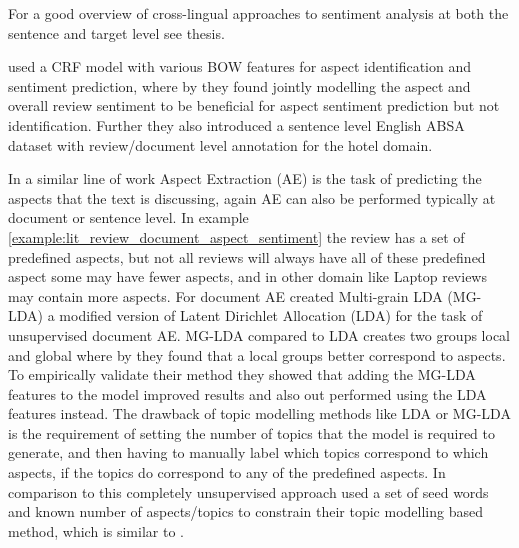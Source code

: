 For a good overview of cross-lingual approaches to sentiment analysis at both the sentence and target level see \citet{barnes2019cross} thesis.

\citet{marcheggiani2014hierarchical} used a CRF model with various BOW features for aspect identification and sentiment prediction, where by they found jointly modelling the aspect and overall review sentiment to be beneficial for aspect sentiment prediction but not identification. Further they also introduced a sentence level English ABSA dataset with review/document level annotation for the hotel domain. 

In a similar line of work Aspect Extraction (AE) is the task of predicting the aspects that the text is discussing, again AE can also be performed typically at document or sentence level. In example \ref{example:lit_review_document_aspect_sentiment} the review has a set of predefined aspects, but not all reviews will always have all of these predefined aspect some may have fewer aspects, and in other domain like Laptop reviews may contain more aspects. For document AE \citet{titov2008modeling} created Multi-grain LDA (MG-LDA) a modified version of Latent Dirichlet Allocation (LDA) for the task of unsupervised document AE. MG-LDA compared to LDA creates two groups local and global where by they found that a local groups better correspond to aspects. To empirically validate their method they showed that adding the MG-LDA features to the \citet{snyder-barzilay-2007-multiple} model improved results and also out performed using the LDA features instead. The drawback of topic modelling methods like LDA or MG-LDA is the requirement of setting the number of topics that the model is required to generate, and then having to manually label which topics correspond to which aspects, if the topics do correspond to any of the predefined aspects. In comparison to this completely unsupervised approach \citet{mukherjee-liu-2012-aspect} used a set of seed words and known number of aspects/topics to constrain their topic modelling based method, which is similar to \citet{Wang2010LatentAR}. 

